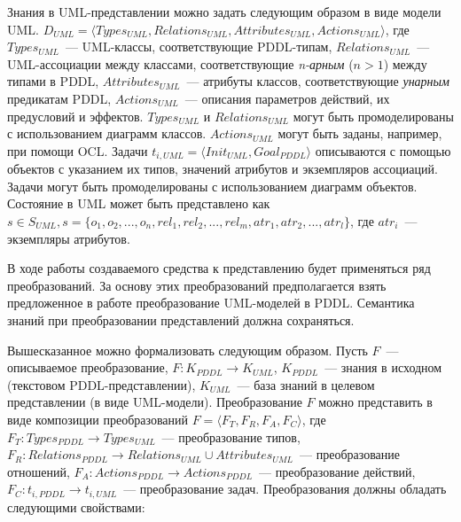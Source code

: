 \documentclass[a4paper,14pt]{extreport}
\begin{document}
    Знания в UML-представлении можно задать следующим образом в виде модели UML.  $D_{UML} = \langle Types_{UML}, Relations_{UML}, Attributes_{UML}, Actions_{UML} \rangle$, где $Types_{UML}$~--- UML-классы, соответствующие PDDL-типам, $Relations_{UML}$~--- UML-ассоциации между классами, соответствующие \textit{n-арным} ($n > 1$) между типами в PDDL, $Attributes_{UML}$~--- атрибуты классов, соответствующие \textit{унарным} предикатам PDDL, $Actions_{UML}$~--- описания параметров действий, их предусловий и эффектов. $Types_{UML}$ и $Relations_{UML}$ могут быть промоделированы с использованием диаграмм классов. $Actions_{UML}$ могут быть заданы, например, при помощи OCL. Задачи  $t_{i, UML} = \langle Init_{UML}, Goal_{PDDL} \rangle$ описываются с помощью объектов с указанием их типов, значений атрибутов и экземпляров ассоциаций. Задачи могут быть промоделированы с использованием диаграмм объектов. Состояние в UML может быть представлено как $ s \in S_{UML}, s = \{o_1, o_2, ..., o_n, rel_1, rel_2, ..., rel_m, atr_1, atr_2, ..., atr_l\}$, где $atr_i$~--- экземпляры атрибутов.
    
    
    В ходе работы создаваемого средства к представлению будет применяться ряд преобразований.  За основу этих преобразований предполагается взять предложенное в работе \cite{mal-manz} преобразование UML-моделей в PDDL. Семантика знаний при преобразовании представлений должна сохраняться. 
    
    Вышесказанное можно формализовать следующим образом. Пусть $F$~--- описываемое преобразование, $F: K_{PDDL} \to K_{UML}$, $K_{PDDL}$~--- знания в исходном (текстовом PDDL-представлении), $K_{UML}$~--- база знаний в целевом представлении (в виде UML-модели). Преобразование $F$ можно представить в виде композиции преобразований $F = \langle F_T, F_R, F_A, F_C \rangle$, где $F_T: Types_{PDDL} \rightarrow Types_{UML}$~--- преобразование типов, $F_R: Relations_{PDDL} \rightarrow Relations_{UML} \cup Attributes_{UML}$~--- преобразование отношений, $F_A: Actions_{PDDL} \rightarrow Actions_{PDDL}$~--- преобразование действий, $F_C: t_{i, PDDL} \rightarrow t_{i, UML}$~--- преобразование задач. Преобразования должны обладать следующими свойствами:
    
\end{document}
